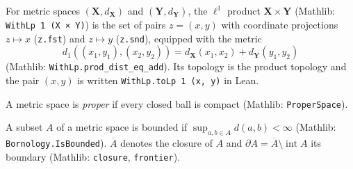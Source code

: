 \begin{definition}
For metric spaces $(\mathbf X,d_{\mathbf X})$ and $(\mathbf Y,d_{\mathbf Y})$, the $\ell^1$ product $\mathbf X\times\mathbf Y$ (Mathlib: \texttt{WithLp 1 (X × Y)}) is the set of pairs $z=(x,y)$ with coordinate projections $z\mapsto x$ (\texttt{z.fst}) and $z\mapsto y$ (\texttt{z.snd}), equipped with the metric
\[
d_1((x_1,y_1),(x_2,y_2))=d_{\mathbf X}(x_1,x_2)+d_{\mathbf Y}(y_1,y_2)
\]
(Mathlib: \texttt{WithLp.prod\_dist\_eq\_add}). Its topology is the product topology and the pair $(x,y)$ is written \texttt{WithLp.toLp 1 (x, y)} in Lean.
\end{definition}
\begin{definition}
A metric space is \emph{proper} if every closed ball is compact (Mathlib: \texttt{ProperSpace}).
\end{definition}
\begin{definition}
A subset $A$ of a metric space is bounded if $\sup_{a,b\in A}d(a,b)<\infty$ (Mathlib: \texttt{Bornology.IsBounded}). $\overline A$ denotes the closure of $A$ and $\partial A=\overline A\setminus\operatorname{int}A$ its boundary (Mathlib: \texttt{closure}, \texttt{frontier}).
\end{definition}
